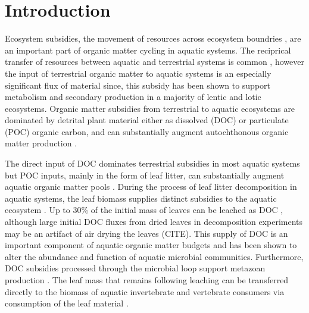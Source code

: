\section{Introduction}
Ecosystem subsidies, the movement of resources across ecosystem boundries \cite{Polis_1997}, are an important part of organic matter cycling in aquatic systems. The reciprical transfer of resources between aquatic and terrestrial systems is common \cite{Nakano_2001}, however the input of terrestrial organic matter to aquatic systems is an especially significant flux of material since, this subsidy has been shown to support metabolism and secondary production in a majority of lentic and lotic ecosystems\cite{Marcarelli_2011}. Organic matter subsidies from terrestrial to aquatic ecosystems are dominated by detrital plant material either as dissolved (DOC) or particulate (POC) organic carbon, and can substantially augment autochthonous organic matter production \cite{Hodkinson_1975,GASITH_1976,wetzel_1984,WETZEL_1995,Webster_1997,Kobayashi_2011,Mehring_2014}.   

The direct input of DOC dominates terrestrial subsidies in most aquatic systems \cite{Rich_1978,wetzel_1984,CITE} but POC inputs, mainly in the form of leaf litter, can substantially augment aquatic organic matter pools \cite{Wetzel_1972,Hodkinson_1975,GASITH_1976,Rich_1978,Wallace_1999,Mehring_2014}. During the process of leaf litter decomposition in aquatic systems, the leaf biomass supplies distinct subsidies to the aquatic ecosystem \cite{Gessner_1999,Marcarelli_2011}. Up to 30\% of the initial mass of leaves can be leached as DOC \cite{CITE,Meyer_1998,Duan_2014}, although large initial DOC fluxes from dried leaves in decomposition experiments may be an artifact of air drying the leaves (CITE). This supply of DOC is an important component of aquatic organic matter budgets \cite{McDowell_1976,Karlsson_2007} and has been shown to alter the abundance \cite{Bott_1984,Fey_2015} and function \cite{MCCONNELL_1968} of aquatic microbial communities. Furthermore, DOC subsidies processed through the microbial loop support metazoan production \cite{Hall_1998,Wilcox_2005,Fey_2015b}.  The leaf mass that remains following leaching can be transferred directly to the biomass of aquatic invertebrate \cite{Wallace_1999,Kobayashi_2011} and vertebrate \cite{Rubbo_2008} consumers via consumption of the leaf material \cite{Gessner_1999}. 

